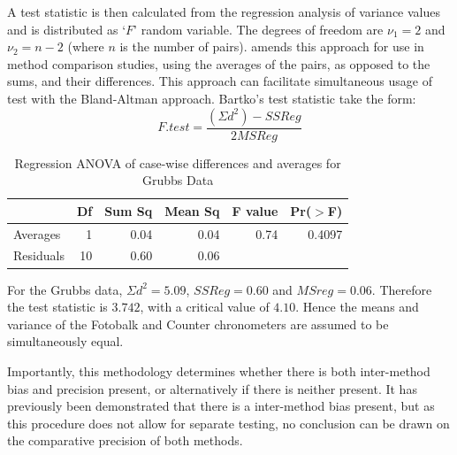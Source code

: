 \documentclass[12pt, a4paper]{report}
\theoremstyle{plain}
\theoremstyle{definition}
\theoremstyle{remark}
\begin{document}
	A test statistic is then calculated from the regression analysis
	of variance values \citep{BB89} and is distributed as `$F$' random
	variable. The degrees of freedom are $\nu_{1}=2$ and $\nu_{2}=n-2$
	(where $n$ is the number of pairs). 
	\citet{Bartko} amends this approach for use in method
	comparison studies, using the averages of the pairs, as opposed to
	the sums, and their differences. This approach can facilitate
	simultaneous usage of test with the Bland-Altman approach.
	Bartko's test statistic take the form:
	\[ F.test = \frac{(\Sigma d^{2})-SSReg}{2MSReg}
	\]
	\begin{table}[ht]
		\begin{center}
			\begin{tabular}{lrrrrr}
				\hline
				& Df & Sum Sq & Mean Sq & F value & Pr($>$F) \\
				\hline
				Averages & 1 & 0.04 & 0.04 & 0.74 & 0.4097 \\
				Residuals & 10 & 0.60 & 0.06 &  &  \\
				\hline
			\end{tabular}
			\caption{Regression ANOVA of case-wise differences and averages
				for Grubbs Data}
		\end{center}
	\end{table}
	
	For the Grubbs data, $\Sigma d^{2}=5.09 $, $SSReg = 0.60$ and $MSreg=0.06$. Therefore the test statistic is $3.742$, with a critical value of $4.10$. Hence the means and variance of the
	Fotobalk and Counter chronometers are assumed to be simultaneously equal.
	
	Importantly, this methodology determines whether there is both inter-method bias and precision present, or alternatively if there
	is neither present. It has previously been demonstrated that there is a inter-method bias present, but as this procedure does not allow for separate testing, no conclusion can be drawn on the comparative precision of both methods.
	
	
	
	
\end{document}
